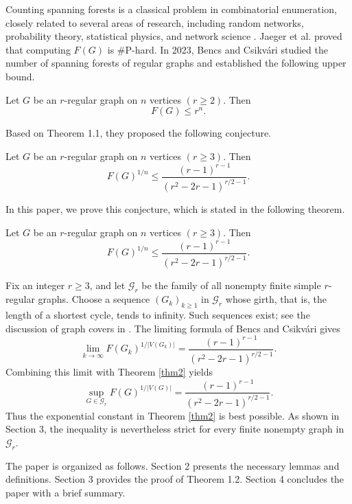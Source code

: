 \documentclass[11pt, a4paper]{article}
\begin{document}
Counting spanning forests is a classical problem in combinatorial enumeration,
closely related to several areas of research, including random networks, probability theory, statistical physics, and network science \cite{Aldous2007, Annan1994, Borbényi2021, Caracciolo2004, Grimmett2004, Liu1981, Teranishi2005, ke2026}.
Jaeger et al. \cite{Jaeger1990} proved that computing $F(G)$ is \#P-hard.
In 2023, Bencs and Csikvári studied the number of spanning forests of regular graphs and established the following upper bound.
\begin{theorem}
Let $G$ be an $r$-regular graph on $n$ vertices $(r \geq 2)$. Then
\[
F(G) \leq r^{n}.
\]
\end{theorem}
Based on Theorem 1.1, they proposed the following conjecture.
\begin{conjecture}
Let $G$ be an $r$-regular graph on $n$ vertices $(r \geq 3)$. Then
\[
F(G)^{1/n} \leq \frac{(r - 1)^{r-1}}{(r^2 - 2r - 1)^{r/2-1}}.
\]
\end{conjecture}
In this paper, we prove this conjecture, which is stated in the following theorem.
\begin{theorem}\label{thm2}
Let $G$ be an $r$-regular graph on $n$ vertices $(r \geq 3)$. Then
\[
F(G)^{1/n} \leq \frac{(r - 1)^{r-1}}{(r^2 - 2r - 1)^{r/2-1}}.
\]
\end{theorem}
\begin{remark}\label{rem:sharpness}
Fix an integer $r\geq3$, and let $\mathcal{G}_r$ be the family of all nonempty finite simple $r$-regular graphs.
Choose a sequence $(G_k)_{k\geq1}$ in $\mathcal{G}_r$ whose girth, that is, the length of a shortest cycle, tends to infinity.
Such sequences exist; see the discussion of graph covers in \cite{Bencs2023}.
The limiting formula of Bencs and Csikv\'ari \cite{BencsTutte2022} gives
\[
\lim_{k\to\infty}F(G_k)^{1/|V(G_k)|}
=\frac{(r-1)^{r-1}}{(r^2-2r-1)^{r/2-1}}.
\]
Combining this limit with Theorem \ref{thm2} yields
\[
\sup_{G\in\mathcal{G}_r}F(G)^{1/|V(G)|}
=\frac{(r-1)^{r-1}}{(r^2-2r-1)^{r/2-1}}.
\]
Thus the exponential constant in Theorem \ref{thm2} is best possible.
As shown in Section 3, the inequality is nevertheless strict for every finite nonempty graph in $\mathcal{G}_r$.
\end{remark}
The paper is organized as follows. Section 2 presents the necessary lemmas and definitions. Section 3 provides the proof of Theorem 1.2. Section 4 concludes the paper with a brief summary.
\end{document}
